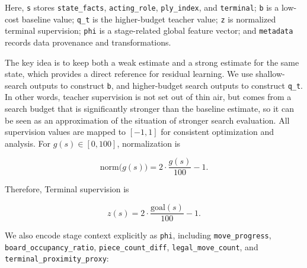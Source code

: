Here, \texttt{s} stores \texttt{state_facts}, \texttt{acting_role}, \texttt{ply_index}, and \texttt{terminal}; \texttt{b} is a low-cost baseline value; \texttt{q_t} is the higher-budget teacher value; \texttt{z} is normalized terminal supervision; \texttt{phi} is a stage-related global feature vector; and \texttt{metadata} records data provenance and transformations.


The key idea is to keep both a weak estimate and a strong estimate for the same state, which provides a direct reference for residual learning. We use shallow-search outputs to construct \texttt{b}, and higher-budget search outputs to construct \texttt{q_t}. In other words, teacher supervision is not set out of thin air, but comes from a search budget that is significantly stronger than the baseline estimate, so it can be seen as an approximation of the situation of stronger search evaluation. All supervision values are mapped to $[-1,1]$ for consistent optimization and analysis. For $g(s)\in[0,100]$, normalization is

\begin{equation}
\mathrm{norm}\bigl(g(s)\bigr)=2\cdot \frac{g(s)}{100}-1.
\end{equation}


Therefore, Terminal supervision is

\begin{equation}
z(s)=2\cdot \frac{\mathrm{goal}(s)}{100}-1.
\end{equation}



We also encode stage context explicitly as \texttt{phi}, including \texttt{move_progress}, \texttt{board_occupancy_ratio}, \texttt{piece_count_diff}, \texttt{legal_move_count}, and \texttt{terminal_proximity_proxy}:

